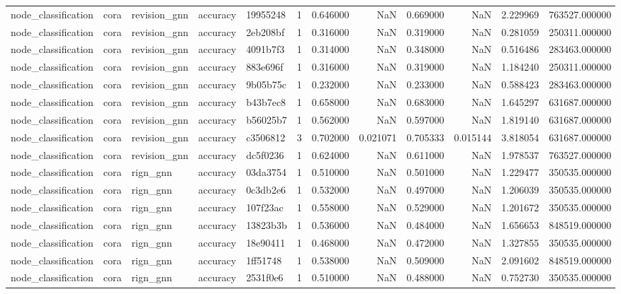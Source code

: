 \begin{tabular}{lllllrrrrrrr}
node_classification & cora & revision_gnn & accuracy & 19955248 & 1 & 0.646000 & NaN & 0.669000 & NaN & 2.229969 & 763527.000000 \\
node_classification & cora & revision_gnn & accuracy & 2eb208bf & 1 & 0.316000 & NaN & 0.319000 & NaN & 0.281059 & 250311.000000 \\
node_classification & cora & revision_gnn & accuracy & 4091b7f3 & 1 & 0.314000 & NaN & 0.348000 & NaN & 0.516486 & 283463.000000 \\
node_classification & cora & revision_gnn & accuracy & 883e696f & 1 & 0.316000 & NaN & 0.319000 & NaN & 1.184240 & 250311.000000 \\
node_classification & cora & revision_gnn & accuracy & 9b05b75c & 1 & 0.232000 & NaN & 0.233000 & NaN & 0.588423 & 283463.000000 \\
node_classification & cora & revision_gnn & accuracy & b43b7ec8 & 1 & 0.658000 & NaN & 0.683000 & NaN & 1.645297 & 631687.000000 \\
node_classification & cora & revision_gnn & accuracy & b56025b7 & 1 & 0.562000 & NaN & 0.597000 & NaN & 1.819140 & 631687.000000 \\
node_classification & cora & revision_gnn & accuracy & c3506812 & 3 & 0.702000 & 0.021071 & 0.705333 & 0.015144 & 3.818054 & 631687.000000 \\
node_classification & cora & revision_gnn & accuracy & dc5f0236 & 1 & 0.624000 & NaN & 0.611000 & NaN & 1.978537 & 763527.000000 \\
node_classification & cora & rign_gnn & accuracy & 03da3754 & 1 & 0.510000 & NaN & 0.501000 & NaN & 1.229477 & 350535.000000 \\
node_classification & cora & rign_gnn & accuracy & 0c3db2e6 & 1 & 0.532000 & NaN & 0.497000 & NaN & 1.206039 & 350535.000000 \\
node_classification & cora & rign_gnn & accuracy & 107f23ac & 1 & 0.558000 & NaN & 0.529000 & NaN & 1.201672 & 350535.000000 \\
node_classification & cora & rign_gnn & accuracy & 13823b3b & 1 & 0.536000 & NaN & 0.484000 & NaN & 1.656653 & 848519.000000 \\
node_classification & cora & rign_gnn & accuracy & 18e90411 & 1 & 0.468000 & NaN & 0.472000 & NaN & 1.327855 & 350535.000000 \\
node_classification & cora & rign_gnn & accuracy & 1ff51748 & 1 & 0.538000 & NaN & 0.509000 & NaN & 2.091602 & 848519.000000 \\
node_classification & cora & rign_gnn & accuracy & 2531f0e6 & 1 & 0.510000 & NaN & 0.488000 & NaN & 0.752730 & 350535.000000 \\

\end{tabular}
